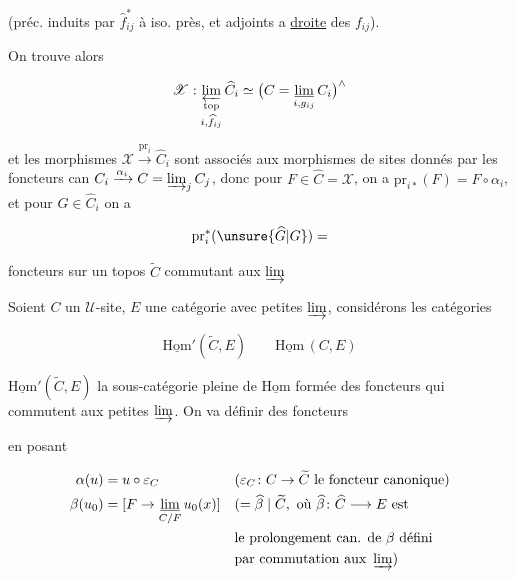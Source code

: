 (préc. induits par $\widehat f_{ij}^{*}$ à iso. près, et adjoints a \uline{droite} des $f_{ij}$).

On trouve alors

\[
\mathscr X:\mathop{\varprojlim_{\mathrm{top}}}_{i,\widehat f_{ij}}\widehat C_i
\simeq\bigl(C=\mathop{\underline{\lim}}_{i,g_{ij}}C_i\bigr)^{\wedge}
\]

et les morphismes $\mathscr X\xrightarrow{\mathrm{pr}_i}\widehat C_i$ sont associés aux morphismes de sites donnés par les foncteurs can $C_i\xrightarrow{\alpha_i}C=\mathop{\varinjlim}_j C_j$, donc pour $F\in\widehat C=\mathscr X$, on a $\mathrm{pr}_{i*}(F)=F\circ\alpha_i$, et pour $G\in\widehat C_i$ on a

\[
\mathrm{pr}_i^*(\unsure{\widehat G|G})=
\]

foncteurs sur un topos $\widetilde C$ commutant aux $\varinjlim$

Soient $C$ un $\mathcal U$-site, $E$ une catégorie avec petites $\varinjlim$, considérons les catégories

\[
\underline{\mathrm{Hom}}'(\widetilde C,E)\qquad\underline{\mathrm{Hom}}\,(C,E)
\]

  $\underline{\mathrm{Hom}}'(\widetilde C,E)$  la sous-catégorie pleine de $\underline{\mathrm{Hom}}$ formée des foncteurs qui commutent aux petites $\varinjlim$. On va définir des foncteurs


en posant

\[
\begin{aligned}
\alpha(u)&=u\circ\varepsilon_C
 &&(\varepsilon_C\colon C\to\widetilde C\ \text{le foncteur canonique})\\
\beta(u_0)&=[F\to\mathop{\underline{\lim}}_{C/F}u_0(x)]
 &&(=\widehat\beta\mid\widetilde C,\ \text{où }\widehat\beta\colon\widehat C\longrightarrow E\ \text{est}\\
&&&\text{le prolongement can. de }\beta\ \text{défini}\\
&&&\text{par commutation aux }\varinjlim)
\end{aligned}
\]

